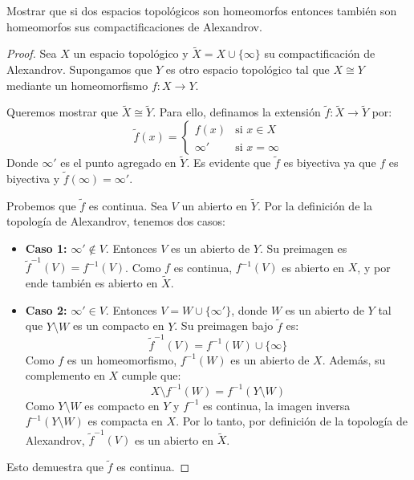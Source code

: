\documentclass{article}
\theoremstyle{plain}
\theoremstyle{definition}
\newenvironment{ejercicio}[1]{\begin{trivlist}
\item[\hskip \labelsep {\bfseries Ejercicio}\hskip \labelsep {\bfseries #1.}]}{\end{trivlist}}
\begin{document}
\begin{ejercicio}{13}
    Mostrar que si dos espacios topológicos son homeomorfos entonces también son homeomorfos sus compactificaciones de Alexandrov.
\end{ejercicio}
\begin{proof}
    Sea \( X \) un espacio topológico y \( \tilde{X} = X \cup \{ \infty \} \) su compactificación de Alexandrov. Supongamos que \( Y \) es otro espacio topológico tal que \( X \cong Y \) mediante un homeomorfismo \( f : X \to Y \).

    Queremos mostrar que \( \tilde{X} \cong \tilde{Y} \). Para ello, definamos la extensión \( \tilde{f} : \tilde{X} \to \tilde{Y} \) por:
    \[
        \tilde{f}(x) = \begin{cases}
            f(x)    & \text{si } x \in X    \\
            \infty' & \text{si } x = \infty
        \end{cases}
    \]
    Donde \( \infty' \) es el punto agregado en \( \tilde{Y} \). Es evidente que \( \tilde{f} \) es biyectiva ya que \( f \) es biyectiva y \( \tilde{f}(\infty) = \infty' \).

    Probemos que \( \tilde{f} \) es continua. Sea \( V \) un abierto en \( \tilde{Y} \). Por la definición de la topología de Alexandrov, tenemos dos casos:
    \begin{itemize}
        \item \textbf{Caso 1:} \( \infty' \notin V \). Entonces \( V \) es un abierto de \( Y \). Su preimagen es \( \tilde{f}^{-1}(V) = f^{-1}(V) \). Como \( f \) es continua, \( f^{-1}(V) \) es abierto en \( X \), y por ende también es abierto en \( \tilde{X} \).
        \item \textbf{Caso 2:} \( \infty' \in V \). Entonces \( V = W \cup \{ \infty' \} \), donde \( W \) es un abierto de \( Y \) tal que \( Y \setminus W \) es un compacto en \( Y \). Su preimagen bajo \( \tilde{f} \) es:
              \[
                  \tilde{f}^{-1}(V) = f^{-1}(W) \cup \{ \infty \}
              \]
              Como \( f \) es un homeomorfismo, \( f^{-1}(W) \) es un abierto de \( X \). Además, su complemento en \( X \) cumple que:
              \[
                  X \setminus f^{-1}(W) = f^{-1}(Y \setminus W)
              \]
              Como \( Y \setminus W \) es compacto en \( Y \) y \( f^{-1} \) es continua, la imagen inversa \( f^{-1}(Y \setminus W) \) es compacta en \( X \). Por lo tanto, por definición de la topología de Alexandrov, \( \tilde{f}^{-1}(V) \) es un abierto en \( \tilde{X} \).
    \end{itemize}
    Esto demuestra que \( \tilde{f} \) es continua.


\end{proof}
\end{document}
